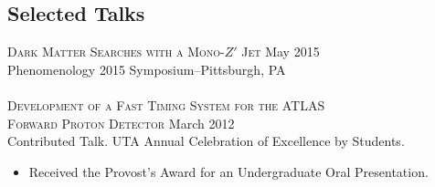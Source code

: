 \documentclass[line,margin]{res}
\begin{document}
\begin{resume}
\section{\sc Selected Talks}
		\textsc{Dark Matter Searches with a Mono-$Z'$ Jet} \hfill May 2015\\
		Phenomenology 2015 Symposium--Pittsburgh, PA\\ \\
		\textsc{Development of a Fast Timing System for the ATLAS \\ Forward Proton Detector} \hfill March 2012\\
		Contributed Talk. UTA Annual Celebration of Excellence by Students.
		  \begin{itemize}
                     \item Received the Provost's Award for an Undergraduate Oral Presentation.
                     \end{itemize}
\fi


\end{resume}
\end{document}
